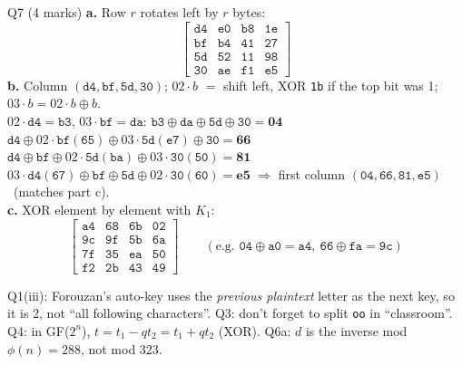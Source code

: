 \documentclass[11pt,a4paper]{article}
\newcommand{\ttx}[1]{\texttt{#1}}
\begin{document}
{\begin{sol}{Q7 (4 marks)}
\textbf{a.} Row $r$ rotates left by $r$ bytes:
\[
\begin{bmatrix}\ttx{d4}&\ttx{e0}&\ttx{b8}&\ttx{1e}\\\ttx{bf}&\ttx{b4}&\ttx{41}&\ttx{27}\\\ttx{5d}&\ttx{52}&\ttx{11}&\ttx{98}\\\ttx{30}&\ttx{ae}&\ttx{f1}&\ttx{e5}\end{bmatrix}
\]
\textbf{b.} Column $(\ttx{d4}, \ttx{bf}, \ttx{5d}, \ttx{30})$; $02 \cdot b$ $=$ shift left, XOR \ttx{1b} if the top bit was 1; $03 \cdot b = 02 \cdot b \oplus b$.\\
$02 \cdot \ttx{d4} = \ttx{b3}$, $03 \cdot \ttx{bf} = \ttx{da}$: \;$\ttx{b3} \oplus \ttx{da} \oplus \ttx{5d} \oplus \ttx{30} = \mathbf{04}$\\
$\ttx{d4} \oplus 02 \cdot \ttx{bf} (\ttx{65}) \oplus 03 \cdot \ttx{5d} (\ttx{e7}) \oplus \ttx{30} = \mathbf{66}$\\
$\ttx{d4} \oplus \ttx{bf} \oplus 02 \cdot \ttx{5d} (\ttx{ba}) \oplus 03 \cdot \ttx{30} (\ttx{50}) = \mathbf{81}$\\
$03 \cdot \ttx{d4} (\ttx{67}) \oplus \ttx{bf} \oplus \ttx{5d} \oplus 02 \cdot \ttx{30} (\ttx{60}) = \mathbf{e5}$ \;$\Rightarrow$ first column $(\ttx{04}, \ttx{66}, \ttx{81}, \ttx{e5})$ \checkmark\ (matches part c).\\
\textbf{c.} XOR element by element with $K_1$:
\[
\begin{bmatrix}\ttx{a4}&\ttx{68}&\ttx{6b}&\ttx{02}\\\ttx{9c}&\ttx{9f}&\ttx{5b}&\ttx{6a}\\\ttx{7f}&\ttx{35}&\ttx{ea}&\ttx{50}\\\ttx{f2}&\ttx{2b}&\ttx{43}&\ttx{49}\end{bmatrix}
\qquad(\text{e.g. } \ttx{04} \oplus \ttx{a0} = \ttx{a4},\ \ttx{66} \oplus \ttx{fa} = \ttx{9c})
\]
\end{sol}

\begin{trap}
Q1(iii): Forouzan's auto-key uses the \emph{previous plaintext} letter as the next key, so it is 2, not ``all following characters''. Q3: don't forget to split \ttx{oo} in ``classroom''. Q4: in GF($2^n$), $t = t_1 - q t_2 = t_1 + q t_2$ (XOR). Q6a: $d$ is the inverse mod $\phi(n) = 288$, not mod 323.
\end{trap}
}
\end{document}
